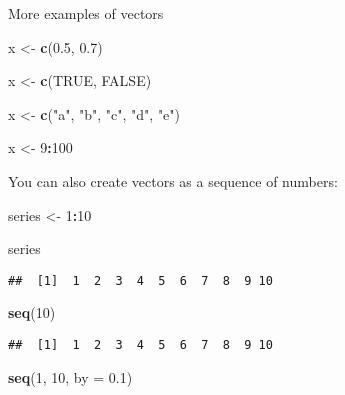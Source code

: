 \documentclass[
]{book}
\newenvironment{Shaded}{\begin{snugshade}}{\end{snugshade}}
\newcommand{\DataTypeTok}[1]{\textcolor[rgb]{0.13,0.29,0.53}{#1}}
\newcommand{\DecValTok}[1]{\textcolor[rgb]{0.00,0.00,0.81}{#1}}
\newcommand{\FloatTok}[1]{\textcolor[rgb]{0.00,0.00,0.81}{#1}}
\newcommand{\KeywordTok}[1]{\textcolor[rgb]{0.13,0.29,0.53}{\textbf{#1}}}
\newcommand{\NormalTok}[1]{#1}
\newcommand{\OperatorTok}[1]{\textcolor[rgb]{0.81,0.36,0.00}{\textbf{#1}}}
\newcommand{\OtherTok}[1]{\textcolor[rgb]{0.56,0.35,0.01}{#1}}
\newcommand{\StringTok}[1]{\textcolor[rgb]{0.31,0.60,0.02}{#1}}
\begin{document}
More examples of vectors

\begin{Shaded}
\begin{Highlighting}[]
\NormalTok{x \textless{}{-}}\StringTok{ }\KeywordTok{c}\NormalTok{(}\FloatTok{0.5}\NormalTok{, }\FloatTok{0.7}\NormalTok{)}

\NormalTok{x \textless{}{-}}\StringTok{ }\KeywordTok{c}\NormalTok{(}\OtherTok{TRUE}\NormalTok{, }\OtherTok{FALSE}\NormalTok{)}

\NormalTok{x \textless{}{-}}\StringTok{ }\KeywordTok{c}\NormalTok{(}\StringTok{"a"}\NormalTok{, }\StringTok{"b"}\NormalTok{, }\StringTok{"c"}\NormalTok{, }\StringTok{"d"}\NormalTok{, }\StringTok{"e"}\NormalTok{)}

\NormalTok{x \textless{}{-}}\StringTok{ }\DecValTok{9}\OperatorTok{:}\DecValTok{100}
\end{Highlighting}
\end{Shaded}

You can also create vectors as a sequence of numbers:

\begin{Shaded}
\begin{Highlighting}[]
\NormalTok{series \textless{}{-}}\StringTok{ }\DecValTok{1}\OperatorTok{:}\DecValTok{10}

\NormalTok{series}
\end{Highlighting}
\end{Shaded}

\begin{verbatim}
##  [1]  1  2  3  4  5  6  7  8  9 10
\end{verbatim}

\begin{Shaded}
\begin{Highlighting}[]
\KeywordTok{seq}\NormalTok{(}\DecValTok{10}\NormalTok{)}
\end{Highlighting}
\end{Shaded}

\begin{verbatim}
##  [1]  1  2  3  4  5  6  7  8  9 10
\end{verbatim}

\begin{Shaded}
\begin{Highlighting}[]
\KeywordTok{seq}\NormalTok{(}\DecValTok{1}\NormalTok{, }\DecValTok{10}\NormalTok{, }\DataTypeTok{by =} \FloatTok{0.1}\NormalTok{)}
\end{Highlighting}
\end{Shaded}
\end{document}
